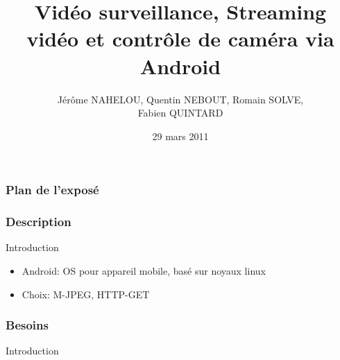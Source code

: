 \documentclass{beamer}
\title{Vidéo surveillance, Streaming vidéo et contrôle de caméra via Android }
\author{Jérôme NAHELOU, Quentin NEBOUT, Romain SOLVE,\\Fabien QUINTARD}
\institute{\large{Chargé de Projet : Yérom-David Bromberg}\\ \bigskip{}
\small{Université Bordeaux 1}}
\date{29 mars 2011}
\begin{document}


\begin{frame}
\frametitle{Plan de l'exposé}
\small{\tableofcontents[hideallsubsections]}
\end{frame}

  \begin{frame}
   \frametitle{Description}
  Introduction
   \begin{itemize}
    \item Android: OS pour appareil mobile, basé sur noyaux linux
    \item Choix: M-JPEG, HTTP-GET
   \end{itemize}
  \end{frame}
  
  \begin{frame}
   \frametitle{Besoins}
  Introduction
  \end{frame}
 
\end{document}
